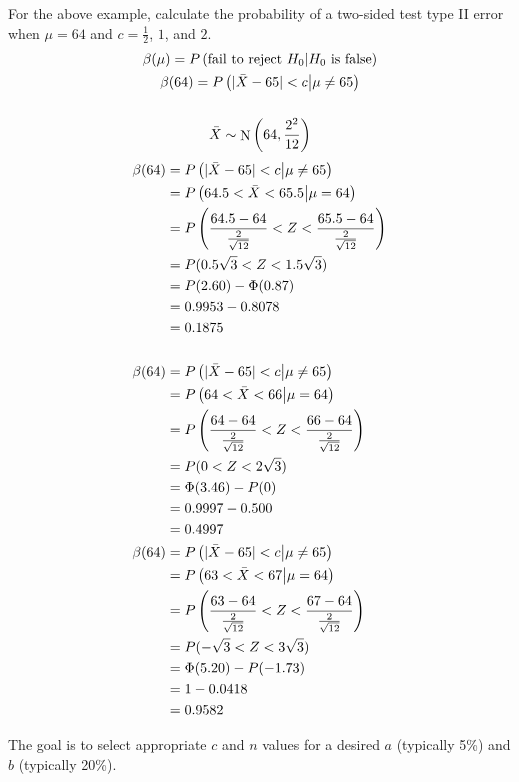 \documentclass[letterpaper,12pt,fleqn]{article}
\newcommand{\m}{\mu}
\renewcommand{\P}{\Phi}
\renewcommand{\b}{\beta}
\newcommand{\cond}[2]{P\left({#1}\middle\vert{#2}\right)}
\DeclareMathOperator{\nd}{N}
\begin{document}
\begin{example}
  For the above example, calculate the probability of a two-sided test type II error when \(\m=64\) and
  \(c=\frac{1}{2}\), \(1\), and \(2\).
  \begin{gather*}
    \b(\m)=\cond{\text{fail to reject}\ H_0}{H_0\ \text{is false}} \\
    \b(64)=\cond{\abs{\bar{X}-65}<c}{\m\ne65} \\
    \\
    \bar{X}\sim\nd\left(64,\frac{2^2}{12}\right)
  \end{gather*}
  \begin{align*}
    \b(64) &= \cond{\abs{\bar{X}-65}<c}{\m\ne65} \\
    &= \cond{64.5<\bar{X}<65.5}{\m=64} \\
    &= P\left(\frac{64.5-64}{\frac{2}{\sqrt{12}}}<Z<\frac{65.5-64}{\frac{2}{\sqrt{12}}}\right) \\
    &= P(0.5\sqrt{3}<Z<1.5\sqrt{3}) \\
    &= P(2.60)-\P(0.87) \\
    &= 0.9953-0.8078 \\
    &= 0.1875 \\
    \\
    \b(64) &= \cond{\abs{\bar{X}-65}<c}{\m\ne65} \\
    &= \cond{64<\bar{X}<66}{\m=64} \\
    &= P\left(\frac{64-64}{\frac{2}{\sqrt{12}}}<Z<\frac{66-64}{\frac{2}{\sqrt{12}}}\right) \\
    &= P(0<Z<2\sqrt{3}) \\
    &= \P(3.46)-P(0) \\
    &= 0.9997-0.500 \\
    &= 0.4997
    \\
    \b(64) &= \cond{\abs{\bar{X}-65}<c}{\m\ne65} \\
    &= \cond{63<\bar{X}<67}{\m=64} \\
    &= P\left(\frac{63-64}{\frac{2}{\sqrt{12}}}<Z<\frac{67-64}{\frac{2}{\sqrt{12}}}\right) \\
    &= P(-\sqrt{3}<Z<3\sqrt{3}) \\
    &= \P(5.20)-P(-1.73) \\
    &= 1-0.0418 \\
    &= 0.9582
  \end{align*}
\end{example}

The goal is to select appropriate \(c\) and \(n\) values for a desired \(a\) (typically 5\%) and \(b\) (typically 20\%).
\end{document}
